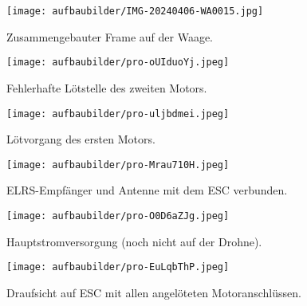 \begin{figure}[htbp]
	\begin{minipage}[b]{0.3\textwidth}
		\centering
		\texttt{[image: aufbaubilder/IMG-20240406-WA0015.jpg]}
		\caption{Zusammengebauter Frame auf der Waage.}
		\label{fig:aufbau7}
	\end{minipage}%
	\hfill
	\begin{minipage}[b]{0.3\textwidth}
		\centering
		\texttt{[image: aufbaubilder/pro-oUIduoYj.jpeg]}
		\caption{Fehlerhafte Lötstelle des zweiten Motors.}
		\label{fig:aufbau9}
	\end{minipage}%
	\hfill
	\begin{minipage}[b]{0.3\textwidth}
		\centering
		\texttt{[image: aufbaubilder/pro-uljbdmei.jpeg]}
		\caption{Lötvorgang des ersten Motors.}
		\label{fig:aufbau10}
	\end{minipage}
	
	\vskip 0.5cm %
\end{figure}
\begin{figure}[htbp]	
	\begin{minipage}[b]{0.3\textwidth}
		\centering
		\texttt{[image: aufbaubilder/pro-Mrau710H.jpeg]}
		\caption{ELRS-Empfänger und Antenne mit dem ESC verbunden.}
		\label{fig:aufbau11}
	\end{minipage}%
	\hfill
	\begin{minipage}[b]{0.3\textwidth}
		\centering
		\texttt{[image: aufbaubilder/pro-O0D6aZJg.jpeg]}
		\caption{Hauptstromversorgung (noch nicht auf der Drohne).}
		\label{fig:aufbau12}
	\end{minipage}%
	\hfill
	\begin{minipage}[b]{0.3\textwidth}
		\centering
		\texttt{[image: aufbaubilder/pro-EuLqbThP.jpeg]}
		\caption{Draufsicht auf ESC mit allen angelöteten Motoranschlüssen.}
		\label{fig:aufbau13}
	\end{minipage}
\end{figure}

